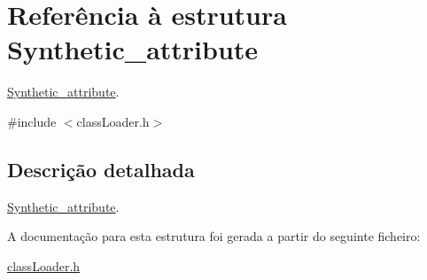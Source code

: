 \hypertarget{struct_synthetic__attribute}{}\section{Referência à estrutura Synthetic\+\_\+attribute}
\label{struct_synthetic__attribute}


\hyperlink{struct_synthetic__attribute}{Synthetic\+\_\+attribute}.  




{\ttfamily \#include $<$class\+Loader.\+h$>$}



\subsection{Descrição detalhada}
\hyperlink{struct_synthetic__attribute}{Synthetic\+\_\+attribute}. 

A documentação para esta estrutura foi gerada a partir do seguinte ficheiro\+:\begin{DoxyCompactItemize}
\item 
\hyperlink{class_loader_8h}{class\+Loader.\+h}\end{DoxyCompactItemize}
